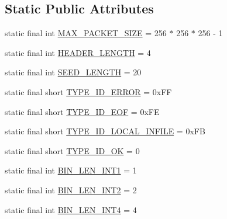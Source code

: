 \subsection*{Static Public Attributes}
\begin{DoxyCompactItemize}
\item 
static final int \mbox{\hyperlink{classcom_1_1mysql_1_1cj_1_1protocol_1_1a_1_1_native_constants_aa9edbadf987b784e07c3ba4440ea320d}{M\+A\+X\+\_\+\+P\+A\+C\+K\+E\+T\+\_\+\+S\+I\+ZE}} = 256 $\ast$ 256 $\ast$ 256 -\/ 1
\item 
static final int \mbox{\hyperlink{classcom_1_1mysql_1_1cj_1_1protocol_1_1a_1_1_native_constants_ac435707deb353a6f568e64fcc8048c93}{H\+E\+A\+D\+E\+R\+\_\+\+L\+E\+N\+G\+TH}} = 4
\item 
static final int \mbox{\hyperlink{classcom_1_1mysql_1_1cj_1_1protocol_1_1a_1_1_native_constants_a7b24e8d30f7741b4ba62883e6113b4b9}{S\+E\+E\+D\+\_\+\+L\+E\+N\+G\+TH}} = 20
\item 
static final short \mbox{\hyperlink{classcom_1_1mysql_1_1cj_1_1protocol_1_1a_1_1_native_constants_afbc4292372d10036c0e99b184ce0450d}{T\+Y\+P\+E\+\_\+\+I\+D\+\_\+\+E\+R\+R\+OR}} = 0x\+FF
\item 
static final short \mbox{\hyperlink{classcom_1_1mysql_1_1cj_1_1protocol_1_1a_1_1_native_constants_ad621118f74b09a09c0f075383aeb236c}{T\+Y\+P\+E\+\_\+\+I\+D\+\_\+\+E\+OF}} = 0x\+FE
\item 
static final short \mbox{\hyperlink{classcom_1_1mysql_1_1cj_1_1protocol_1_1a_1_1_native_constants_a73cda67f8e28f05735be795e29d8b2c6}{T\+Y\+P\+E\+\_\+\+I\+D\+\_\+\+L\+O\+C\+A\+L\+\_\+\+I\+N\+F\+I\+LE}} = 0x\+FB
\item 
static final short \mbox{\hyperlink{classcom_1_1mysql_1_1cj_1_1protocol_1_1a_1_1_native_constants_a5dfab3c89b660796ea9d7ff15d59efb8}{T\+Y\+P\+E\+\_\+\+I\+D\+\_\+\+OK}} = 0
\item 
static final int \mbox{\hyperlink{classcom_1_1mysql_1_1cj_1_1protocol_1_1a_1_1_native_constants_affcc036e27742bd3a25c8693df3028a0}{B\+I\+N\+\_\+\+L\+E\+N\+\_\+\+I\+N\+T1}} = 1
\item 
static final int \mbox{\hyperlink{classcom_1_1mysql_1_1cj_1_1protocol_1_1a_1_1_native_constants_aa08656d0437b993de83e5fd78df00b51}{B\+I\+N\+\_\+\+L\+E\+N\+\_\+\+I\+N\+T2}} = 2
\item 
static final int \mbox{\hyperlink{classcom_1_1mysql_1_1cj_1_1protocol_1_1a_1_1_native_constants_ac6de5b341de5992fb1a8d803b5d99472}{B\+I\+N\+\_\+\+L\+E\+N\+\_\+\+I\+N\+T4}} = 4
\item 

\end{DoxyCompactItemize}
